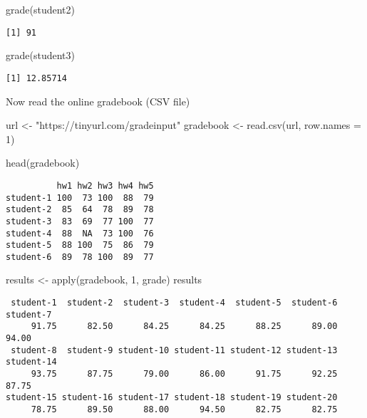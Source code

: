 \documentclass[
  letterpaper,
  DIV=11,
  numbers=noendperiod]{scrartcl}
\newenvironment{Shaded}{\begin{snugshade}}{\end{snugshade}}
\newcommand{\AttributeTok}[1]{\textcolor[rgb]{0.40,0.45,0.13}{#1}}
\newcommand{\DecValTok}[1]{\textcolor[rgb]{0.68,0.00,0.00}{#1}}
\newcommand{\FunctionTok}[1]{\textcolor[rgb]{0.28,0.35,0.67}{#1}}
\newcommand{\NormalTok}[1]{\textcolor[rgb]{0.00,0.23,0.31}{#1}}
\newcommand{\OtherTok}[1]{\textcolor[rgb]{0.00,0.23,0.31}{#1}}
\newcommand{\StringTok}[1]{\textcolor[rgb]{0.13,0.47,0.30}{#1}}
\begin{document}
\begin{Shaded}
\begin{Highlighting}[]
\FunctionTok{grade}\NormalTok{(student2)}
\end{Highlighting}
\end{Shaded}

\begin{verbatim}
[1] 91
\end{verbatim}

\begin{Shaded}
\begin{Highlighting}[]
\FunctionTok{grade}\NormalTok{(student3)}
\end{Highlighting}
\end{Shaded}

\begin{verbatim}
[1] 12.85714
\end{verbatim}

Now read the online gradebook (CSV file)

\begin{Shaded}
\begin{Highlighting}[]
\NormalTok{url }\OtherTok{\textless{}{-}} \StringTok{"https://tinyurl.com/gradeinput"}
\NormalTok{gradebook }\OtherTok{\textless{}{-}} \FunctionTok{read.csv}\NormalTok{(url, }\AttributeTok{row.names =} \DecValTok{1}\NormalTok{)}

\FunctionTok{head}\NormalTok{(gradebook)}
\end{Highlighting}
\end{Shaded}

\begin{verbatim}
          hw1 hw2 hw3 hw4 hw5
student-1 100  73 100  88  79
student-2  85  64  78  89  78
student-3  83  69  77 100  77
student-4  88  NA  73 100  76
student-5  88 100  75  86  79
student-6  89  78 100  89  77
\end{verbatim}

\begin{Shaded}
\begin{Highlighting}[]
\NormalTok{results }\OtherTok{\textless{}{-}} \FunctionTok{apply}\NormalTok{(gradebook, }\DecValTok{1}\NormalTok{, grade)}
\NormalTok{results}
\end{Highlighting}
\end{Shaded}

\begin{verbatim}
 student-1  student-2  student-3  student-4  student-5  student-6  student-7 
     91.75      82.50      84.25      84.25      88.25      89.00      94.00 
 student-8  student-9 student-10 student-11 student-12 student-13 student-14 
     93.75      87.75      79.00      86.00      91.75      92.25      87.75 
student-15 student-16 student-17 student-18 student-19 student-20 
     78.75      89.50      88.00      94.50      82.75      82.75 
\end{verbatim}
\end{document}
